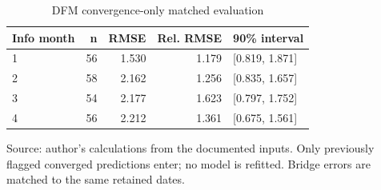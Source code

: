 \begin{table}[htbp]
\centering
\footnotesize
\caption{DFM convergence-only matched evaluation}
\begin{tabularx}{\linewidth}{XrrrX}
\toprule
Info month & n & RMSE & Rel. RMSE & 90\% interval \\
\midrule
1 & 56 & 1.530 & 1.179 & [0.819, 1.871] \\
2 & 58 & 2.162 & 1.256 & [0.835, 1.657] \\
3 & 54 & 2.177 & 1.623 & [0.797, 1.752] \\
4 & 56 & 2.212 & 1.361 & [0.675, 1.561] \\
\bottomrule
\end{tabularx}
\par\vspace{3pt}\begin{minipage}{\linewidth}\footnotesize Source: author's calculations from the documented inputs.\allowbreak{} Only previously flagged converged predictions enter; no model is refitted.\allowbreak{} Bridge errors are matched to the same retained dates.\allowbreak{}\end{minipage}
\end{table}
